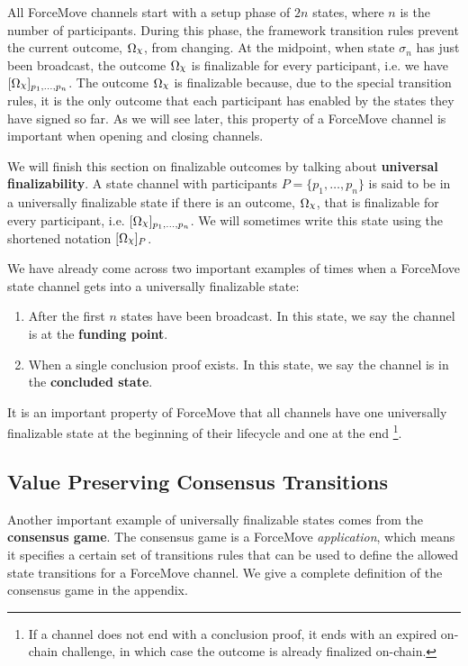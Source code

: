 \documentclass{article}
\begin{document}
\begin{example}{}
  All ForceMove channels start with a setup phase of $2n$ states, where $n$ is the number of participants.
  During this phase, the framework transition rules prevent the current outcome, $\Omega_\rchi$, from changing.
  At the midpoint, when state $\sigma_n$ has just been broadcast, the outcome
  $\Omega_\rchi$ is finalizable for every participant, i.e. we have
  $\enf{\Omega_\rchi}_{p_1, \dots, p_n}$.
  The outcome $\Omega_\rchi$ is finalizable because, due to the special transition rules,
  it is the only outcome that each participant has enabled by the states they have signed so far.
  As we will see later, this property of a ForceMove channel is important when opening and
  closing channels.
\end{example}

We will finish this section on finalizable outcomes by talking about \textbf{universal finalizability}.
A state channel with participants $P = \{p_1, \dots, p_n\}$ is said to be in a universally finalizable
state if there is an outcome, $\Omega_\rchi$, that is finalizable for every participant, i.e.
$\enf{\Omega_\rchi}_{p_1,\dots, p_n}$.
We will sometimes write this state using the shortened notation $\enf{\Omega_\rchi}_P$.

We have already come across two important examples of times when a ForceMove state channel
gets into a universally finalizable state:
\begin{enumerate}
  \item After the first $n$ states have been broadcast. In this state, we say the channel is at the \textbf{funding point}.
  \item When a single conclusion proof exists. In this state, we say the channel is in the \textbf{concluded state}.
\end{enumerate}
It is an important property of ForceMove that all channels have one universally finalizable
state at the beginning of their lifecycle and one at the end
\footnote{If a channel does not end with a conclusion proof, it ends with an expired on-chain challenge,
in which case the outcome is already finalized on-chain.}.

\subsection{Value Preserving Consensus Transitions}

Another important example of universally finalizable states comes from the \textbf{consensus game}.
The consensus game is a ForceMove \textit{application}, which means it specifies a certain
set of transitions rules that can be used to define the allowed state transitions for a ForceMove
channel.
We give a complete definition of the consensus game in the appendix.
\end{document}
